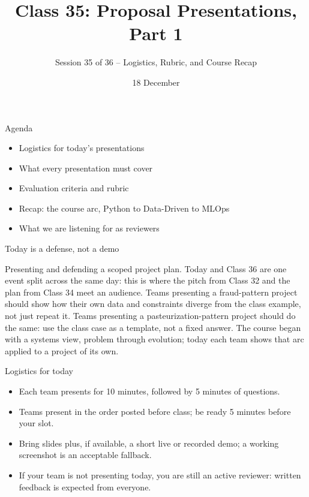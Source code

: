 

\title{Class 35: Proposal Presentations, Part 1}
\subtitle{Session 35 of 36 -- Logistics, Rubric, and Course Recap}
\author{\coursename}
\date{18 December}



\frame{\titlepage \coursefooter}

\begin{frame}{Agenda}
\begin{itemize}
\item Logistics for today's presentations
\item What every presentation must cover
\item Evaluation criteria and rubric
\item Recap: the course arc, Python to Data-Driven to MLOps
\item What we are listening for as reviewers
\end{itemize}
\coursefooter
\end{frame}

\begin{frame}{Today is a defense, not a demo}
\coursefooter
\end{frame}

\coursecontextframe
{Presenting and defending a scoped project plan.}
{Today and Class 36 are one event split across the same day: this is where the pitch from Class 32 and the plan from Class 34 meet an audience.}
{Teams presenting a fraud-pattern project should show how their own data and constraints diverge from the class example, not just repeat it.}
{Teams presenting a pasteurization-pattern project should do the same: use the class case as a template, not a fixed answer.}
{The course began with a systems view, problem through evolution; today each team shows that arc applied to a project of its own.}

\begin{frame}{Logistics for today}
\begin{itemize}
\item Each team presents for 10 minutes, followed by 5 minutes of questions.
\item Teams present in the order posted before class; be ready 5 minutes before your slot.
\item Bring slides plus, if available, a short live or recorded demo; a working screenshot is an acceptable fallback.
\item If your team is not presenting today, you are still an active reviewer: written feedback is expected from everyone.
\end{itemize}
\coursefooter
\end{frame}

